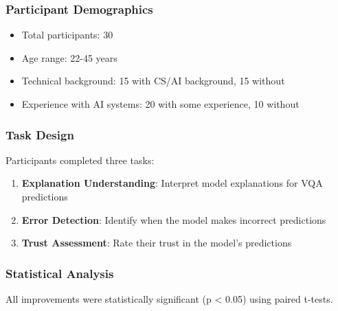 \documentclass[manuscript,review,anonymous]{acmart}
\begin{document}
\subsubsection{Participant Demographics}

\begin{itemize}
    \item Total participants: 30
    \item Age range: 22-45 years
    \item Technical background: 15 with CS/AI background, 15 without
    \item Experience with AI systems: 20 with some experience, 10 without
\end{itemize}

\subsubsection{Task Design}

Participants completed three tasks:
\begin{enumerate}
    \item \textbf{Explanation Understanding}: Interpret model explanations for VQA predictions
    \item \textbf{Error Detection}: Identify when the model makes incorrect predictions
    \item \textbf{Trust Assessment}: Rate their trust in the model's predictions
\end{enumerate}

\subsubsection{Statistical Analysis}

All improvements were statistically significant (p < 0.05) using paired t-tests.
\end{document}
